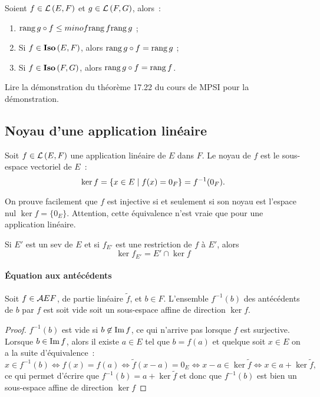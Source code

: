 \begin{prop}
	Soient $f \in \mathcal{L}\left(E,F\right)$ et $g \in \mathcal{L}\left(F,G\right)$, alors~:
	\begin{enumerate}
		\item $\operatorname{rang}{g \circ f} \leq minof{\operatorname{rang}{f}}{\operatorname{rang}{g}}$ ;
		\item Si $f \in \mathbf{Iso}\left(E,F\right)$, alors $\operatorname{rang}{g \circ f} = \operatorname{rang}{g}$ ;
		\item Si $f \in \mathbf{Iso}\left(F,G\right)$, alors $\operatorname{rang}{g \circ f} = \operatorname{rang}{f}$.
	\end{enumerate}
\end{prop}
Lire la démonstration du théorème 17.22 du cours de MPSI pour la démonstration.

\subsection{Noyau d'une application linéaire}
\begin{defdef}
	Soit $f \in \mathcal{L}\left(E,F\right)$ une application linéaire de $E$ dans $F$.  Le noyau de $f$ est le sous-espace vectoriel de $E$~:
	\begin{equation}
		\ker{f} = \left\{x \in E\mathrel{}\middle|\mathrel{}f(x)=0_F\right\} = f^{-1}(0_F).
	\end{equation}
\end{defdef}

On prouve facilement que $f$ est injective si et seulement si son noyau est l'espace nul $\ker{f} = \{0_E\}$. Attention, cette équivalence n'est vraie que pour une application linéaire.

Si $E'$ est un sev de $E$ et si $f_{E'}$ est une restriction de $f$ à $E'$, alors 
\begin{equation}
	\ker{f_{E'}} = E' \cap \ker{f}
\end{equation}

\paragraph{Équation aux antécédents}
\begin{prop}
	Soit $f \in \mathcal{A}{E}{F}$, de partie linéaire $\tilde{f}$, et $b \in F$. L'ensemble $f^{-1}(b)$ des antécédents de $b$ par $f$ est soit vide soit un sous-espace affine de direction $\ker{f}$.
\end{prop}
\begin{proof}
	$f^{-1}(b)$ est vide si $b \not\in \operatorname{Im}{f}$, ce qui n'arrive pas lorsque $f$ est surjective. Lorsque $b \in \operatorname{Im}{f}$, alors il existe $a \in E$ tel que $b=f(a)$ et quelque soit $x \in E$ on a la suite d'équivalence~:
	\begin{equation}
		x \in f^{-1}(b) \iff f(x)=f(a) \iff \tilde{f}(x-a)=0_E \iff x-a \in \ker{\tilde{f}} \iff x \in a + \ker{\tilde{f}},
	\end{equation}
	ce qui permet d'écrire que $f^{-1}(b) = a + \ker{\tilde{f}}$ et donc que $f^{-1}(b)$ est bien un sous-espace affine de direction $\ker{f}$
\end{proof}

